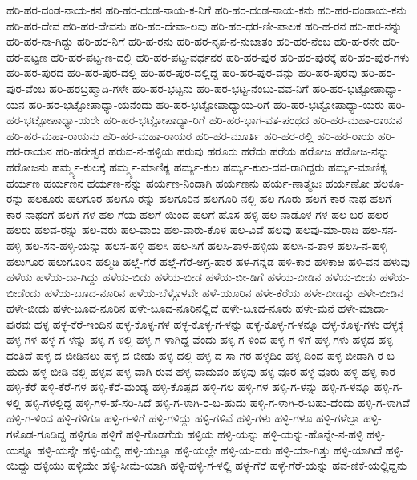 ಹರಿ-ಹರ-ದಂಡ-ನಾಯ-ಕನ
ಹರಿ-ಹರ-ದಂಡ-ನಾಯ-ಕ-ನಿಗೆ
ಹರಿ-ಹರ-ದಂಡ-ನಾಯ-ಕನು
ಹರಿ-ಹರ-ದಂಡಾಯ-ಕನು
ಹರಿ-ಹರ-ದೇವ
ಹರಿ-ಹರ-ದೇವನು
ಹರಿ-ಹರ-ದೇವಾ-ಲವು
ಹರಿ-ಹರ-ಧರ-ಣೀ-ಪಾಲಕ
ಹರಿ-ಹ-ರನ
ಹರಿ-ಹರ-ನನ್ನು
ಹರಿ-ಹರ-ನಾ-ಗಿದ್ದು
ಹರಿ-ಹರ-ನಿಗೆ
ಹರಿ-ಹ-ರನು
ಹರಿ-ಹರ-ನೃಪ-ನ-ನುಜಾತಂ
ಹರಿ-ಹರ-ನೆಂಬ
ಹರಿ-ಹ-ರನೇ
ಹರಿ-ಹರ-ಪಟ್ಟಣ
ಹರಿ-ಹರ-ಪಟ್ಟ-ಣ-ದಲ್ಲಿ
ಹರಿ-ಹರ-ಪಟ್ಟ-ವರ್ಧನರ
ಹರಿ-ಹರ-ಪುರ
ಹರಿ-ಹರ-ಪುರಕ್ಕೆ
ಹರಿ-ಹರ-ಪುರ-ಗಳು
ಹರಿ-ಹರ-ಪುರದ
ಹರಿ-ಹರ-ಪುರ-ದಲ್ಲಿ
ಹರಿ-ಹರ-ಪುರ-ದಲ್ಲಿದ್ದ
ಹರಿ-ಹರ-ಪುರ-ವನ್ನು
ಹರಿ-ಹರ-ಪುರವು
ಹರಿ-ಹರ-ಪುರ-ವೆಂಬ
ಹರಿ-ಹರಬ್ರಹ್ಮಾದಿ-ಗಳೇ
ಹರಿ-ಹರ-ಭಟ್ಟನು
ಹರಿ-ಹರ-ಭಟ್ಟ-ನೆಂಬು-ವವ-ನಿಗೆ
ಹರಿ-ಹರ-ಭಟ್ಟೋಪಾಧ್ಯಾ-ಯನ
ಹರಿ-ಹರ-ಭಟ್ಟೋಪಾಧ್ಯಾ-ಯನೆಂದು
ಹರಿ-ಹರ-ಭಟ್ಟೋಪಾಧ್ಯಾಯ-ರಿಗೆ
ಹರಿ-ಹರ-ಭಟ್ಟೋಪಾಧ್ಯಾ-ಯರು
ಹರಿ-ಹರ-ಭಟ್ಟೋಪಾಧ್ಯಾ-ಯರೇ
ಹರಿ-ಹರ-ಭಟ್ಟೋಪಾಧ್ಯಾ-ರಿಗೆ
ಹರಿ-ಹರ-ಭಾಗ-ವತ-ಪಂಥದ
ಹರಿ-ಹರ-ಮಹಾ-ರಾಯನ
ಹರಿ-ಹರ-ಮಹಾ-ರಾಯನು
ಹರಿ-ಹರ-ಮಹಾ-ರಾಯರ
ಹರಿ-ಹರ-ಮೂರ್ತಿ
ಹರಿ-ಹರ-ರಲ್ಲಿ
ಹರಿ-ಹರ-ರಾಯ
ಹರಿ-ಹರ-ರಾಯನ
ಹರಿ-ಹರೇಶ್ವರ
ಹರುವ-ನ-ಹಳ್ಳಿಯ
ಹರುವು
ಹರೂರು
ಹರೆದು
ಹರೆಯ
ಹರೋಜ
ಹರೋಜ-ನನ್ನು
ಹರೋಜನು
ಹರ್ಮ್ಮ್ಯ-ಕುಲಕ್ಕೆ
ಹರ್ಮ್ಮ್ಯ-ಮಾಣಿಕ್ಯ
ಹರ್ಮ್ಯ-ಕುಲ
ಹರ್ಮ್ಯ-ಕುಲ-ದವ-ರಾಗಿದ್ದರು
ಹರ್ಮ್ಯ-ಮಾಣಿಕ್ಯ
ಹರ್ಯಣ
ಹರ್ಯಣನ
ಹರ್ಯಣ-ನನ್ನು
ಹರ್ಯಣ-ನಿಂದಾಗಿ
ಹರ್ಯಣನು
ಹರ್ಯ-ಣಾತ್ಮಜಃ
ಹರ್ಯಣೋ
ಹಲಕೂ-ರನ್ನು
ಹಲಕೂರು
ಹಲಗೂರ
ಹಲಗೂ-ರನ್ನು
ಹಲಗೂರಿನ
ಹಲಗೂರಿ-ನಲ್ಲಿ
ಹಲ-ಗೂರು
ಹಲಗೆ-ಕಾರ-ನಾಥ
ಹಲಗೆ-ಕಾರ-ನಾಥಂಗೆ
ಹಲಗೆ-ಗಳ
ಹಲ-ಗೆಯ
ಹಲಗೆ-ಯಿಂದ
ಹಲಗೆ-ಹೊಸ-ಹಳ್ಳಿ
ಹಲ-ನಾಡೊಳ-ಗಳ
ಹಲ-ಬರ
ಹಲರ
ಹಲರು
ಹಲವ-ರನ್ನು
ಹಲ-ವರು
ಹಲ-ವಾರು
ಹಲ-ವಾರು-ಕೊಳ
ಹಲ-ವಿವೆ
ಹಲವು
ಹಲವು-ಮಾ-ರಾದಿ
ಹಲ-ಸನ-ಹಳ್ಳಿ
ಹಲ-ಸನ-ಹಳ್ಳಿ-ಯನ್ನು
ಹಲಸ-ಹಳ್ಳಿ
ಹಲಸಿ
ಹಲ-ಸಿಗೆ
ಹಲಸಿ-ತಾಳ-ಹಳ್ಳಿಯ
ಹಲಸಿ-ನ-ತಾಳ
ಹಲಸಿ-ನ-ಹಳ್ಳಿ
ಹಲುಗೂರ
ಹಲುಗೂರಿನ
ಹಲ್ಮಿಡಿ
ಹಲ್ಲೆ-ಗೆರೆ
ಹಲ್ಲೆ-ಗೆರೆ-ಅಗ್ರ-ಹಾರ
ಹಳ-ಗನ್ನಡ
ಹಳಿ-ಕಾರ
ಹಳಿಕಾಱ
ಹಳಿ-ವನ
ಹಳುವು
ಹಳೆಯ
ಹಳೆಯ-ದಾ-ಗಿದ್ದು
ಹಳೆಯ-ಬಿಡು
ಹಳೆಯ-ಬೀಡ
ಹಳೆಯ-ಬೀ-ಡಿಗೆ
ಹಳೆಯ-ಬೀಡಿನ
ಹಳೆಯ-ಬೀಡು
ಹಳೆಯ-ಬೀಡೆಂದು
ಹಳೆಯ-ಬೂದ-ನೂರಿನ
ಹಳೆಯ-ಬೆಳ್ಗೊಳವೇ
ಹಳೆ-ಯೂರಿನ
ಹಳೇ-ಕೆರೆಯ
ಹಳೇ-ಬೀಡನ್ನು
ಹಳೇ-ಬೀಡಿನ
ಹಳೇ-ಬೀಡು
ಹಳೇ-ಬೂದ-ನೂರಿನ
ಹಳೇ-ಬೂದ-ನೂರಿನಲ್ಲಿದೆ
ಹಳೇ-ಬೂದ-ನೂರು
ಹಳೇ-ಮನೆ
ಹಳೇ-ಮಾದಾ-ಪುರವು
ಹಳ್ಳ
ಹಳ್ಳ-ಕೆರೆ-ಇಂದಿನ
ಹಳ್ಳ-ಕೊಳ್ಳ-ಗಳ
ಹಳ್ಳ-ಕೊಳ್ಳ-ಗ-ಳನ್ನು
ಹಳ್ಳ-ಕೊಳ್ಳ-ಗ-ಳನ್ನೂ
ಹಳ್ಳ-ಕೊಳ್ಳ-ಗಳು
ಹಳ್ಳಕ್ಕೆ
ಹಳ್ಳ-ಗಳ
ಹಳ್ಳ-ಗ-ಳನ್ನು
ಹಳ್ಳ-ಗ-ಳಲ್ಲಿ
ಹಳ್ಳ-ಗ-ಳಾಗಿದ್ದ-ವೆಂದು
ಹಳ್ಳ-ಗ-ಳಿಂದ
ಹಳ್ಳ-ಗ-ಳಿಗೆ
ಹಳ್ಳ-ಗಳು
ಹಳ್ಳದ
ಹಳ್ಳ-ದಂತಿದೆ
ಹಳ್ಳ-ದ-ಬೀಡಿನಲು
ಹಳ್ಳ-ದ-ಬೀಡು
ಹಳ್ಳ-ದಲ್ಲಿ
ಹಳ್ಳ-ದ-ಸಾ-ಗರ
ಹಳ್ಳದಿಂ
ಹಳ್ಳ-ದಿಂದ
ಹಳ್ಳ-ಬೀಡಾಗಿ-ರ-ಬ-ಹುದು
ಹಳ್ಳ-ಬೀಡಿ-ನಲ್ಲಿ
ಹಳ್ಳವ
ಹಳ್ಳ-ವಾಗಿ-ರುವ
ಹಳ್ಳ-ವಾದುವಂ
ಹಳ್ಳವು
ಹಳ್ಳ-ವೂರ
ಹಳ್ಳ-ವೂರು
ಹಳ್ಳಿ
ಹಳ್ಳಿ-ಕಾರ
ಹಳ್ಳಿ-ಕೆರೆ
ಹಳ್ಳಿ-ಕೆರೆ-ಗಳ
ಹಳ್ಳಿ-ಕೆರೆ-ಮಂಡ್ಯ
ಹಳ್ಳಿ-ಕೊಪ್ಪದ
ಹಳ್ಳಿ-ಗಲ
ಹಳ್ಳಿ-ಗಳ
ಹಳ್ಳಿ-ಗ-ಳನ್ನು
ಹಳ್ಳಿ-ಗ-ಳನ್ನೂ
ಹಳ್ಳಿ-ಗ-ಳಲ್ಲಿ
ಹಳ್ಳಿ-ಗಳಲ್ಲಿದ್ದ
ಹಳ್ಳಿ-ಗಳ-ಹೆ-ಸರಿ-ಸಿದೆ
ಹಳ್ಳಿ-ಗ-ಳಾಗಿ-ರ-ಬ-ಹುದು
ಹಳ್ಳಿ-ಗ-ಳಾಗಿ-ರ-ಬಹು-ದೆಂದು
ಹಳ್ಳಿ-ಗ-ಳಾಗಿವೆ
ಹಳ್ಳಿ-ಗ-ಳಿಂದ
ಹಳ್ಳಿ-ಗಳಿಗೂ
ಹಳ್ಳಿ-ಗ-ಳಿಗೆ
ಹಳ್ಳಿ-ಗಳಿದ್ದು
ಹಳ್ಳಿ-ಗಳಿವೆ
ಹಳ್ಳಿ-ಗಳು
ಹಳ್ಳಿ-ಗಳೂ
ಹಳ್ಳಿ-ಗಳೆಲ್ಲಾ
ಹಳ್ಳಿ-ಗಳೊಡ-ಗೂಡಿದ್ದ
ಹಳ್ಳಿಗೂ
ಹಳ್ಳಿಗೆ
ಹಳ್ಳಿ-ಗೊಡಗೆಯ
ಹಳ್ಳಿಯ
ಹಳ್ಳಿ-ಯನ್ನು
ಹಳ್ಳಿ-ಯನ್ನು-ಹೊನ್ನೇ-ನ-ಹಳ್ಳಿ
ಹಳ್ಳಿ-ಯನ್ನೂ
ಹಳ್ಳಿ-ಯನ್ನೇ
ಹಳ್ಳಿ-ಯಲ್ಲಿ
ಹಳ್ಳಿ-ಯಲ್ಲೂ
ಹಳ್ಳಿ-ಯಲ್ಲೇ
ಹಳ್ಳಿ-ಯ-ವರು
ಹಳ್ಳಿ-ಯಾ-ಗಿತ್ತು
ಹಳ್ಳಿ-ಯಾಗಿದೆ
ಹಳ್ಳಿ-ಯಿದ್ದು
ಹಳ್ಳಿಯು
ಹಳ್ಳಿಯೇ
ಹಳ್ಳಿ-ಸೀಮೆ-ಯಾಗಿ
ಹಳ್ಳಿ-ಹಳ್ಳಿ-ಗ-ಳಲ್ಲಿ
ಹಳ್ಳೆ-ಗೆರೆ
ಹಳ್ಳೆ-ಗೆರೆ-ಯನ್ನು
ಹವ-ಣಿಕೆ-ಯಲ್ಲಿದ್ದನು
